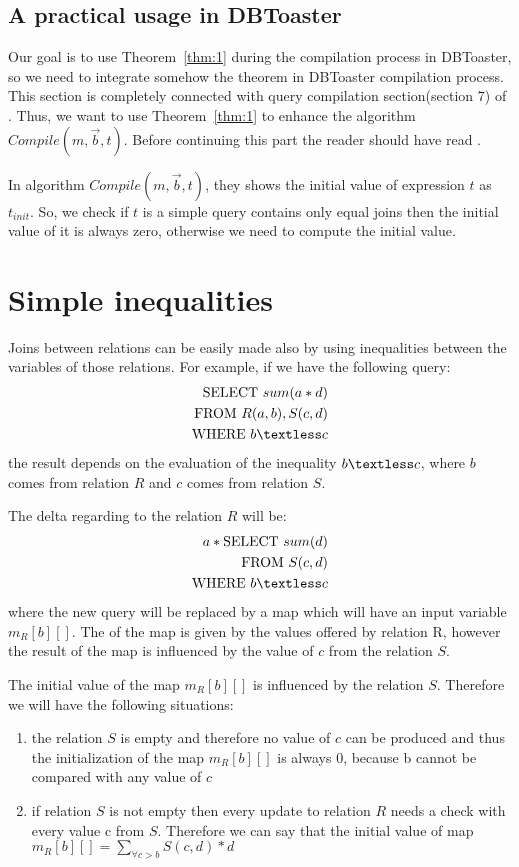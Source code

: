 \documentclass[12pt]{article}
\begin{document}
\subsection{A practical usage in DBToaster}
Our goal is to use Theorem~\ref{thm:1} during the compilation process in DBToaster, so we need to integrate somehow the theorem in DBToaster compilation process. This section is completely connected with query compilation section(section 7)  of \cite{1}.  Thus, we want to  use Theorem~\ref{thm:1} to  enhance  the algorithm $Compile(m,\vec{b},t)$.  Before continuing this part the reader should have read \cite{1}. \par
In algorithm $Compile(m,\vec{b},t)$, they shows the initial value of expression $t$ as $t_{init}$. So, we check if $t$ is a simple query contains only equal joins then the initial value of it is always zero, otherwise we need to compute the initial value. 
\section{Simple inequalities}

Joins between relations can be easily made also by using inequalities between the variables of those relations. For example, if we have the following query:
\begin{align*}
\mbox{SELECT }sum(a*d)\\
\mbox{FROM } R(a,b),S(c,d)\\
\mbox{WHERE } b\textless c 
\end{align*}
the result depends on the evaluation of the inequality $b\textless c$, where $b$ comes from relation $R$ and $c$ comes from relation $S$.

The delta regarding to the relation $R$ will be: 
\begin{align*}
a*\mbox{SELECT }sum(d)\\
\mbox{FROM }S(c,d)\\
\mbox{WHERE } b\textless c 
\end{align*}
where the new query will be replaced by a map which will have an input variable $m_R[b][]$. The \dom{} of the map is given by the values offered by relation R, however the result of the map is influenced by the value of $c$ from the relation $S$.

The initial value of the map $m_R[b][]$ is influenced by the relation $S$. Therefore we will have the following situations:
\begin{enumerate}
\item the relation $S$ is empty and therefore no value of $c$ can be produced and thus the initialization of the map $m_R[b][]$ is always 0, because b cannot be compared with any value of $c$
\item if relation $S$ is not empty then every update to relation $R$  needs a check with every value c from $S$. Therefore we can say that the initial value of map $m_R[b][]=\sum_{\forall c>b} S(c,d)*d$
\end{enumerate}
\end{document}
